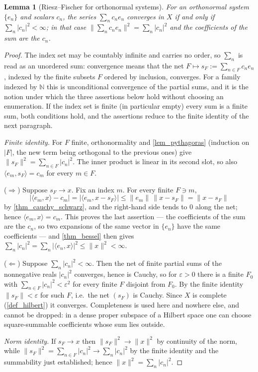 \documentclass[a4paper]{report}
\theoremstyle{plain}
\newtheorem{lemma}[theorem]{Lemma}
\theoremstyle{definition}
\theoremstyle{remark}
\begin{document}
\begin{lemma}[Riesz--Fischer for orthonormal systems]
  \label{lem_riesz_fischer}
  For an orthonormal system $\{e_n\}$ and scalars $c_n$, the series $\sum_n c_ne_n$
  converges in $X$ \emph{if and only if} $\sum_n|c_n|^2 < \infty$; in that case
  $\|\sum_n c_ne_n\|^2 = \sum_n|c_n|^2$ and the coefficients of the sum are the $c_n$.
\end{lemma}
\begin{proof}
  The index set may be countably infinite and carries no order, so $\sum_n$ is read as an
  unordered sum: convergence means that the net $F \mapsto s_F := \sum_{n \in F}c_ne_n$,
  indexed by the finite subsets $F$ ordered by inclusion, converges.  For a family indexed by $\mathbb{N}$ this is unconditional
  convergence of the partial sums, and it is the notion under which the three assertions
  below hold without choosing an enumeration.  If the index set is finite (in particular
  empty) every sum is a finite sum, both conditions hold, and the assertions reduce to the
  finite identity of the next paragraph.

  \emph{Finite identity.}  For $F$ finite, orthonormality and \cref{lem_pythagoras}
  (induction on $|F|$, the new term being orthogonal to the previous ones) give
  $\|s_F\|^2 = \sum_{n \in F}|c_n|^2$.  The inner product is linear in its second slot,
  so also $\langle e_m, s_F\rangle = c_m$ for every $m \in F$.

  ($\Rightarrow$)  Suppose $s_F \to x$.  Fix an index $m$.  For every finite $F \ni m$,
  \[
    |\langle e_m, x\rangle - c_m| = |\langle e_m, x - s_F\rangle|
      \le \|e_m\|\,\|x-s_F\| = \|x - s_F\|
  \]
  by \cref{thm_cauchy_schwarz}, and the right-hand side tends to $0$ along the net; hence
  $\langle e_m,x\rangle = c_m$.  This proves the last assertion --- the coefficients of the
  sum are the $c_n$, so two expansions of the same vector in $\{e_n\}$ have the same
  coefficients --- and \cref{thm_bessel} then gives
  $\sum_n|c_n|^2 = \sum_n|\langle e_n,x\rangle|^2 \le \|x\|^2 < \infty$.

  ($\Leftarrow$)  Suppose $\sum_n|c_n|^2 < \infty$.  Then the net of finite partial sums of
  the nonnegative reals $|c_n|^2$ converges, hence is Cauchy, so for $\varepsilon>0$ there
  is a finite $F_0$ with $\sum_{n \in F}|c_n|^2 < \varepsilon^2$ for every finite $F$
  disjoint from $F_0$.  By the finite
  identity $\|s_F\| < \varepsilon$ for such $F$, i.e.\ the net $(s_F)$ is Cauchy.  Since
  $X$ is complete (\cref{def_hilbert}) it converges.  Completeness is used here and nowhere
  else, and cannot be dropped: in a dense proper subspace of a Hilbert space one can choose
  square-summable coefficients whose sum lies outside.

  \emph{Norm identity.}  If $s_F \to x$ then $\|s_F\|^2 \to \|x\|^2$ by continuity of the
  norm, while $\|s_F\|^2 = \sum_{n\in F}|c_n|^2 \to \sum_n|c_n|^2$ by the finite identity
  and the summability just established; hence $\|x\|^2 = \sum_n|c_n|^2$.
\end{proof}
\end{document}
